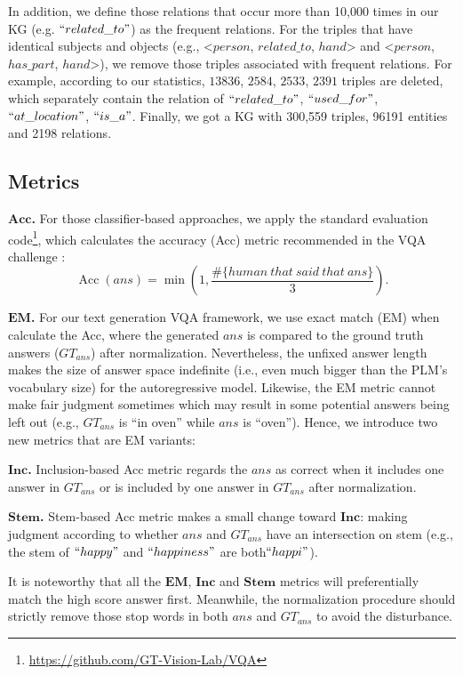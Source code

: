 \documentclass[sigconf]{acmart}
\newcommand{\cjy}[1]{{\color{black}#1}}
\begin{document}
In addition, we define those relations \cjy{that occur more than 10,000 times in our KG (e.g. $``related\_to"$) as the frequent relations. }
\cjy{For the triples that have identical subjects and objects (e.g., <$person$, $related\_to$, $hand$> and <$person$, $has\_part$, $hand$>), 
we remove those triples associated with frequent relations}.
For example, according to our statistics, $13836$, $2584$, $2533$, $2391$ triples are deleted, which separately contain the relation of $``related\_to"$, $``used\_for"$, $``at\_location"$, $``is\_a"$.
Finally, we got \cjy{a KG with 300,559 triples, 96191 entities and 2198 relations.}
\subsection{Metrics} \label{sec:acc}
\noindent\textbf{$\mathbf{Acc}$.} For those classifier-based approaches, we apply the standard 
evaluation code\footnote{\url{https://github.com/GT-Vision-Lab/VQA}}, which 
\cjy{calculates the accuracy (Acc)} metric recommended in the VQA challenge \citep{antol2015vqa}:
\begin{equation}
	\operatorname{Acc}(ans)=\min (1, \frac{\#\{{ human~that~said~that~ans }\}}{3}). 
\end{equation}


\noindent\textbf{$\mathbf{EM}$.} For our text generation VQA framework, we use exact match (EM)  when calculate the Acc, where the generated $ans$ is compared to the ground truth answers ($GT_{ans}$) after normalization. 
Nevertheless, the unfixed answer length make\cjy{s} the size of answer space indefinite (i.e., even much bigger than \cjy{the PLM's vocabulary size}) for the autoregressive model. Likewise, the EM metric cannot make fair judgment sometimes which may result in some potential answers being left out (e.g., $GT_{ans}$ is ``in oven'' while $ans$ is ``oven'').
Hence, we introduce two \cjy{new metrics that are EM variants:}

\noindent\textbf{$\mathbf{Inc}$.} Inclusion-based Acc metric  regards the $ans$ as correct when it includes \cjy{one answer in $GT_{ans}$ or is included by one answer} in $GT_{ans}$ after normalization.

\noindent\textbf{$\mathbf{Stem}$.} Stem-based  Acc metric makes a small change toward $\mathbf{Inc}$: making judgment according to whether $ans$ and $GT_{ans}$ have an intersection on stem (e.g., the stem of $``happy"$ and $``happiness"$ are both$``happi"$).

It is noteworthy that all the $\mathbf{EM}$, $\mathbf{Inc}$ and $\mathbf{Stem}$ metrics will preferentially match the high score answer first. Meanwhile, the normalization procedure should strictly remove those stop words in both $ans$ and $GT_{ans}$ to avoid the disturbance.
\end{document}
